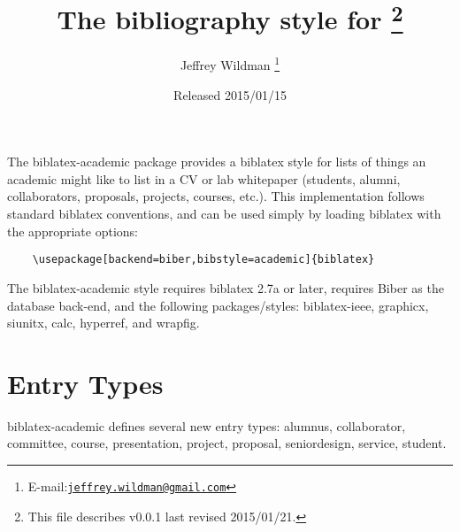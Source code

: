 \documentclass[11pt,letterpaper]{article}
\author{Jeffrey Wildman%
  \thanks{E-mail:\href{mailto:jeffrey.wildman@gmail.com}%
  {\texttt{jeffrey.wildman@gmail.com}}}
}
\title{The \pkg{academic} bibliography style for \pkg{biblatex}%
  \footnote{This file describes v0.0.1 last revised 2015/01/21.}%
}
\date{Released 2015/01/15}
\newcommand{\pkg}[1]{\textsf{#1}}
\newcommand{\entry}[1]{\textsf{#1}}
\begin{document}
\maketitle

The \pkg{biblatex-academic} package provides a \pkg{biblatex} style for lists of things an academic might like to list in a CV or lab whitepaper (students, alumni, collaborators, proposals, projects, courses, etc.).
This implementation follows standard \pkg{biblatex} conventions, and can be used simply by loading \pkg{biblatex} with the appropriate options:
\begin{verbatim}
    \usepackage[backend=biber,bibstyle=academic]{biblatex}
\end{verbatim}
The \pkg{biblatex-academic} style requires \pkg{biblatex} 2.7a or later, requires \pkg{Biber} as the database back-end, and the following packages/styles: \pkg{biblatex-ieee}, \pkg{graphicx}, \pkg{siunitx}, \pkg{calc}, \pkg{hyperref}, and \pkg{wrapfig}.


\section{Entry Types}\label{sec:entry-types}

\pkg{biblatex-academic} defines several new entry types:
\entry{alumnus},
\entry{collaborator},
\entry{committee},
\entry{course},
\entry{presentation},
\entry{project},
\entry{proposal},
\entry{seniordesign},
\entry{service},
\entry{student}.
\end{document}
